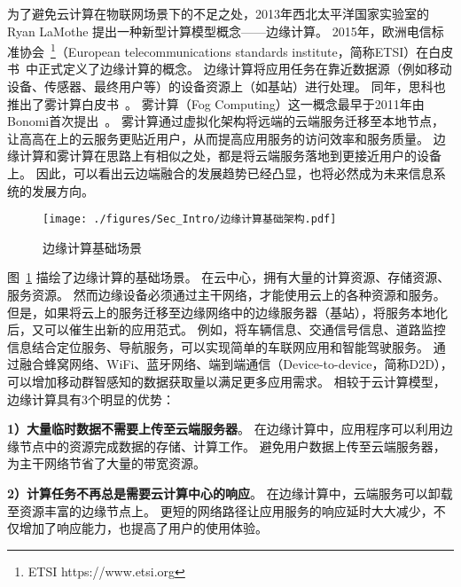 为了避免云计算在物联网场景下的不足之处，2013年西北太平洋国家实验室的 Ryan LaMothe 提出一种新型计算模型概念——边缘计算。
2015年，欧洲电信标准协会~\footnote{ETSI https://www.etsi.org}（European telecommunications standards institute，简称ETSI）在白皮书~\cite{hu2015mobile}中正式定义了边缘计算的概念。
边缘计算将应用任务在靠近数据源（例如移动设备、传感器、最终用户等）的设备资源上（如基站）进行处理。
同年，思科也推出了雾计算白皮书~\cite{computing2015internet}。
雾计算（Fog Computing）这一概念最早于2011年由Bonomi首次提出~\cite{bonomi2011connected}。
雾计算通过虚拟化架构将远端的云端服务迁移至本地节点，让高高在上的云服务更贴近用户，从而提高应用服务的访问效率和服务质量。
边缘计算和雾计算在思路上有相似之处，都是将云端服务落地到更接近用户的设备上。
因此，可以看出云边端融合的发展趋势已经凸显，也将必然成为未来信息系统的发展方向。

\begin{figure}[!h]
  \centering
  \texttt{[image: ./figures/Sec\_Intro/边缘计算基础架构.pdf]}
  \vspace{-0.5em}
  \caption{边缘计算基础场景}
  \vspace{-1em}
  \label{Figure_EC_Architecture}
\end{figure}

图~\ref{Figure_EC_Architecture} 描绘了边缘计算的基础场景。
在云中心，拥有大量的计算资源、存储资源、服务资源。
然而边缘设备必须通过主干网络，才能使用云上的各种资源和服务。
但是，如果将云上的服务迁移至边缘网络中的边缘服务器（基站），将服务本地化后，又可以催生出新的应用范式。
例如，将车辆信息、交通信号信息、道路监控信息结合定位服务、导航服务，可以实现简单的车联网应用和智能驾驶服务。
通过融合蜂窝网络、WiFi、蓝牙网络、端到端通信（Device-to-device，简称D2D），可以增加移动群智感知的数据获取量以满足更多应用需求。
相较于云计算模型，边缘计算具有3个明显的优势：

\textbf{1）大量临时数据不需要上传至云端服务器}。
在边缘计算中，应用程序可以利用边缘节点中的资源完成数据的存储、计算工作。
避免用户数据上传至云端服务器，为主干网络节省了大量的带宽资源。

\textbf{2）计算任务不再总是需要云计算中心的响应}。
在边缘计算中，云端服务可以卸载至资源丰富的边缘节点上。
更短的网络路径让应用服务的响应延时大大减少，不仅增加了响应能力，也提高了用户的使用体验。

